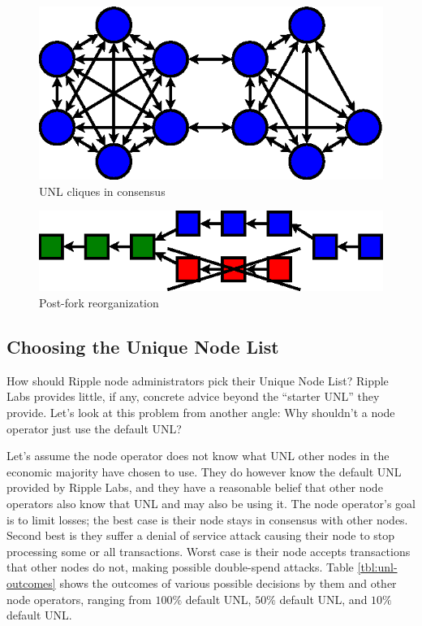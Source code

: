 \documentclass{article}
\begin{document}
\begin{figure}
    \centering
    \includegraphics{figures/unl-clique-consensus.eps}
    \caption{UNL cliques in consensus}
    \label{fig:unl-clique-consensus}
\end{figure}

\begin{figure}
    \centering
    \includegraphics{figures/unl-clique-reorganized-blockchain.eps}
    \caption{Post-fork reorganization}
    \label{fig:unl-clique-post-fork}
\end{figure}


\subsection{Choosing the Unique Node List}
\label{choosing-the-unl}

How should Ripple node administrators pick their Unique Node List? Ripple Labs
provides little, if any, concrete advice beyond the ``starter UNL'' they
provide. Let's look at this problem from another angle: Why shouldn't a node
operator just use the default UNL?

Let's assume the node operator does not know what UNL other nodes in the
economic majority have chosen to use. They do however know the default UNL
provided by Ripple Labs, and they have a reasonable belief that other node
operators also know that UNL and may also be using it. The node operator's goal
is to limit losses; the best case is their node stays in consensus with other
nodes. Second best is they suffer a denial of service attack causing their node
to stop processing some or all transactions. Worst case is their node accepts
transactions that other nodes do not, making possible double-spend attacks.
Table \ref{tbl:unl-outcomes} shows the outcomes of various possible
decisions by them and other node operators, ranging from $100\%$ default UNL,
$50\%$ default UNL, and $10\%$ default UNL.
\end{document}
